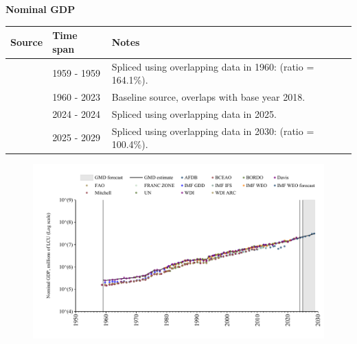 \documentclass[12pt,a4paper,landscape]{article}
\begin{document}
\begin{adjustbox}{max totalsize={\paperwidth}{\paperheight},center}
\begin{minipage}[t][\textheight][t]{\textwidth}
\vspace*{0.5cm}
{}
\begin{center}
{\Large\bfseries Nominal GDP}
\end{center}
\vspace{0.5cm}
\begin{table}[H]
\centering
\small
\begin{tabular}{|l|l|l|}
\hline
\textbf{Source} & \textbf{Time span} & \textbf{Notes} \\
\hline
\rowcolor{white}\cite{Mitchell}& 1959 - 1959 &Spliced using overlapping data in 1960: (ratio = 164.1\%). \\
\rowcolor{lightgray}\cite{WDI}& 1960 - 2023 &Baseline source, overlaps with base year 2018. \\
\rowcolor{white}\cite{BCEAO}& 2024 - 2024 &Spliced using overlapping data in 2025. \\
\rowcolor{lightgray}\cite{IMF_WEO_forecast}& 2025 - 2029 &Spliced using overlapping data in 2030: (ratio = 100.4\%). \\
\hline
\end{tabular}
\end{table}
\begin{figure}[H]
\centering
\includegraphics[width=\textwidth,height=0.6\textheight,keepaspectratio]{graphs/SEN_nGDP.pdf}
\end{figure}
\end{minipage}
\end{adjustbox}
\end{document}
